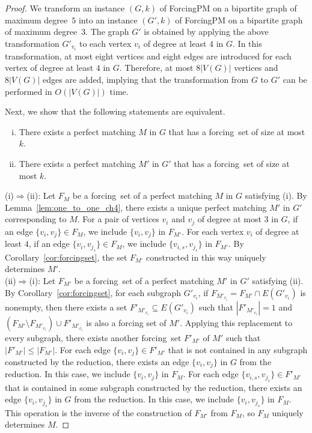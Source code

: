 \documentclass[a4paper,10pt]{article}
\newcommand{\FS}{\rm forcing~set}
\newcommand{\FPM}{\sc ForcingPM} %
\begin{document}
\begin{proof}
    We transform an instance $(G,k)$ of {\FPM} on a bipartite graph of maximum degree~$5$ into an instance $(G',k)$ of {\FPM} on a bipartite graph of maximum degree~$3$.
    The graph $G'$ is obtained by applying the above transformation $G'_{v_i}$ to each vertex $v_i$ of degree at least $4$ in $G$.
    In this transformation, at most eight vertices and eight edges are introduced for each vertex of degree at least $4$ in $G$.
    Therefore, at most $8|V(G)|$ vertices and $8|V(G)|$ edges are added, implying that the transformation from $G$ to $G'$ can be performed in $O(|V(G)|)$ time.

    Next, we show that the following statements are equivalent.
    \begin{enumerate}[(i)]
        \item There exists a perfect matching $M$ in $G$ that has a {\FS} of size at most $k$.
        \item There exists a perfect matching $M'$ in $G'$ that has a {\FS} of size at most $k$.
    \end{enumerate}

    \noindent (i)$\Rightarrow$(ii):
    Let $F_M$ be a {\FS} of a perfect matching $M$ in $G$ satisfying (i).
    By Lemma~\ref{lem:one_to_one_ch4}, there exists a unique perfect matching $M'$ in $G'$ corresponding to $M$.
    For a pair of vertices $v_i$ and $v_j$ of degree at most $3$ in $G$, if an edge $\{v_i, v_j\}\in F_M$, we include $\{v_i, v_j\}$ in $F_{M'}$.
    For each vertex $v_i$ of degree at least $4$, if an edge $\{v_i, v_{j_s}\}\in F_M$, we include $\{v_{i,s}, v_{j_s}\}$ in $F_{M'}$.
    By Corollary~\ref{cor:forcingset}, the set $F_{M'}$ constructed in this way uniquely determines $M'$.\\

    \noindent (ii)$\Rightarrow$(i):
    Let $F_{M'}$ be a {\FS} of a perfect matching $M'$ in $G'$ satisfying (ii).
    By Corollary~\ref{cor:forcingset}, for each subgraph $G'_{v_i}$, if $F_{M'_{v_i}} = F_{M'} \cap E(G'_{v_i})$ is nonempty, then there exists a set $F'_{M'_{v_i}} \subseteq E(G'_{v_i})$ such that $|F'_{M'_{v_i}}|=1$ and $(F_{M'} \setminus F_{M'_{v_i}})\cup F'_{M'_{v_i}}$ is also a forcing set of $M'$.
    Applying this replacement to every subgraph, there exists another {\FS} $F'_{M'}$ of $M'$ such that $|F'_{M'}|\le |F_{M'}|$.
    For each edge $\{v_i, v_j\}\in F'_{M'}$ that is not contained in any subgraph constructed by the reduction, there exists an edge $\{v_i, v_j\}$ in $G$ from the reduction.
    In this case, we include $\{v_i, v_j\}$ in $F_M$.
    For each edge $\{v_{i,s}, v_{j_s}\}\in F'_{M'}$ that is contained in some subgraph constructed by the reduction, there exists an edge $\{v_i, v_{j_s}\}$ in $G$ from the reduction.
    In this case, we include $\{v_i, v_{j_s}\}$ in $F_M$.
    This operation is the inverse of the construction of $F_{M'}$ from $F_M$, so $F_M$ uniquely determines $M$.
\end{proof}
\end{document}
